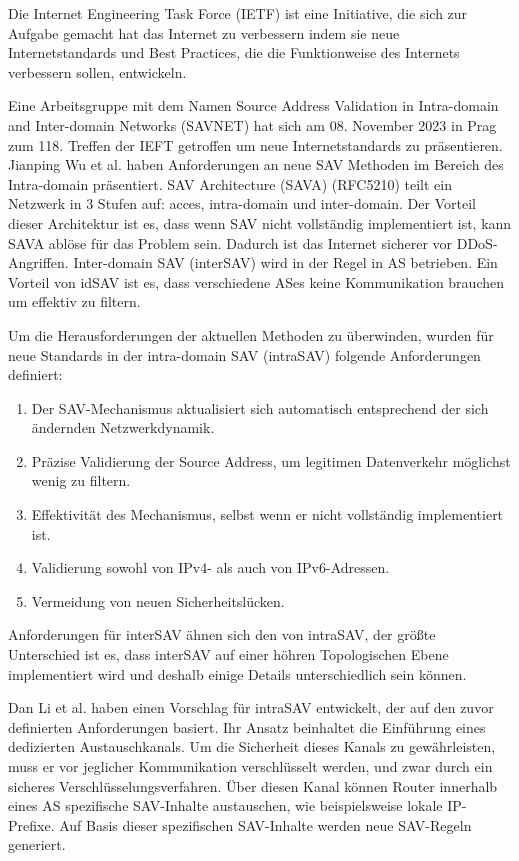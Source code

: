 \documentclass[sigplan,screen]{acmart}
\begin{document}
Die Internet Engineering Task Force (IETF) ist eine Initiative, die sich zur Aufgabe gemacht hat das Internet zu verbessern indem sie neue Internetstandards und Best Practices, die die Funktionweise des Internets verbessern sollen, entwickeln.

Eine Arbeitsgruppe mit dem Namen Source Address Validation in Intra-domain and Inter-domain Networks (SAVNET) hat sich am 08. November 2023 in Prag zum 118. Treffen der IEFT getroffen um neue Internetstandards zu präsentieren. 
Jianping Wu et al. \cite{SAV_requirements01} haben Anforderungen an neue SAV Methoden im Bereich des Intra-domain präsentiert. SAV Architecture (SAVA) (RFC5210) teilt ein Netzwerk in 3 Stufen auf: acces, intra-domain und inter-domain. Der Vorteil dieser Architektur ist es, dass wenn SAV nicht vollständig implementiert ist, kann SAVA ablöse für das Problem sein. Dadurch ist das Internet sicherer vor DDoS-Angriffen. Inter-domain SAV (interSAV) wird in der Regel in AS betrieben. Ein Vorteil von idSAV ist es, dass verschiedene ASes keine Kommunikation brauchen um effektiv zu filtern.

Um die Herausforderungen der aktuellen Methoden zu überwinden, wurden für neue Standards in der intra-domain SAV (intraSAV)  folgende Anforderungen definiert:

\begin{enumerate}
\item Der SAV-Mechanismus aktualisiert sich automatisch entsprechend der sich ändernden Netzwerkdynamik.
\item Präzise Validierung der Source Address, um legitimen Datenverkehr möglichst wenig zu filtern.
\item Effektivität des Mechanismus, selbst wenn er nicht vollständig implementiert ist.
\item Validierung sowohl von IPv4- als auch von IPv6-Adressen.
\item Vermeidung von neuen Sicherheitslücken.
\end{enumerate}

Anforderungen für interSAV ähnen sich den von intraSAV, der größte Unterschied ist es, dass interSAV auf einer höhren Topologischen Ebene implementiert wird und deshalb einige Details unterschiedlich sein können.

Dan Li et al. \cite{intraSAVNET01} haben einen Vorschlag für intraSAV entwickelt, der auf den zuvor definierten Anforderungen basiert. Ihr Ansatz beinhaltet die Einführung eines dedizierten Austauschkanals. Um die Sicherheit dieses Kanals zu gewährleisten, muss er vor jeglicher Kommunikation verschlüsselt werden, und zwar durch ein sicheres Verschlüsselungsverfahren. Über diesen Kanal können Router innerhalb eines AS spezifische SAV-Inhalte austauschen, wie beispielsweise lokale IP-Prefixe. Auf Basis dieser spezifischen SAV-Inhalte werden neue SAV-Regeln generiert.
\end{document}
